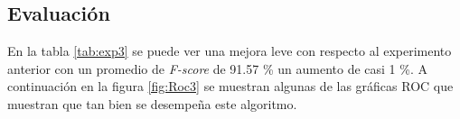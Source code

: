 	\subsection{Evaluación}
	\begin{center}
	  
	\end{center}
	
	\par En la tabla \ref{tab:exp3} se puede ver una mejora leve con respecto al experimento anterior con un promedio de \textit{F-score} de 91.57 \% un aumento de casi 1 \%. A continuación en la figura \ref{fig:Roc3}  se muestran algunas de las gráficas ROC que muestran que tan bien se desempeña este algoritmo.
		
	 \begin{figure}
	     
	\begin{table}[H]
		\centering
\end{table}
\end{figure}
